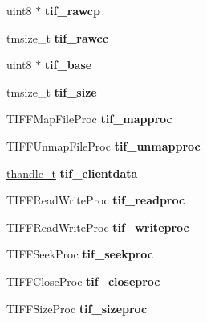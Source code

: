 \begin{DoxyCompactItemize}
\item 
\mbox{\label{structtiff_ae423c0f88e038d4432854c75c1fa9996}} 
uint8 $\ast$ {\bfseries tif\+\_\+rawcp}
\item 
\mbox{\label{structtiff_a4c7251edc7df8dd6e6588fba546c7d90}} 
tmsize\+\_\+t {\bfseries tif\+\_\+rawcc}
\item 
\mbox{\label{structtiff_a6e47f0c379b692552f4df2ce0ea4fbc8}} 
uint8 $\ast$ {\bfseries tif\+\_\+base}
\item 
\mbox{\label{structtiff_a98a06f0e3c85e831eeb7654d38f57336}} 
tmsize\+\_\+t {\bfseries tif\+\_\+size}
\item 
\mbox{\label{structtiff_abdd878f0175f15a67d70ca96304f893d}} 
T\+I\+F\+F\+Map\+File\+Proc {\bfseries tif\+\_\+mapproc}
\item 
\mbox{\label{structtiff_a1bf06a5a3f42e40dfddc81a4e3bf7767}} 
T\+I\+F\+F\+Unmap\+File\+Proc {\bfseries tif\+\_\+unmapproc}
\item 
\mbox{\label{structtiff_a6c9e5282821a7eb1fee483142145591a}} 
\hyperlink{interfacevoid}{thandle\+\_\+t} {\bfseries tif\+\_\+clientdata}
\item 
\mbox{\label{structtiff_a06934e5a1b6f0f993144bfec7359ae6a}} 
T\+I\+F\+F\+Read\+Write\+Proc {\bfseries tif\+\_\+readproc}
\item 
\mbox{\label{structtiff_a09c8ddad9dccafb538446823dc9e09be}} 
T\+I\+F\+F\+Read\+Write\+Proc {\bfseries tif\+\_\+writeproc}
\item 
\mbox{\label{structtiff_a1c31747013e5b0578af7affc5630fa3b}} 
T\+I\+F\+F\+Seek\+Proc {\bfseries tif\+\_\+seekproc}
\item 
\mbox{\label{structtiff_a6014bc0fc4b0b6eb24fe9d5c41da8f98}} 
T\+I\+F\+F\+Close\+Proc {\bfseries tif\+\_\+closeproc}
\item 
\mbox{\label{structtiff_af98260e3851f9c3ed4841e410b8a41e4}} 
T\+I\+F\+F\+Size\+Proc {\bfseries tif\+\_\+sizeproc}

\end{DoxyCompactItemize}
